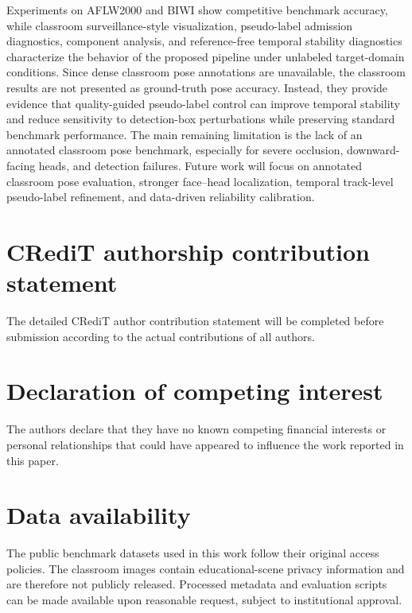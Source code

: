 \documentclass[preprint,12pt]{elsarticle}
\begin{document}
Experiments on AFLW2000 and BIWI show competitive benchmark accuracy, while classroom surveillance-style visualization, pseudo-label admission diagnostics, component analysis, and reference-free temporal stability diagnostics characterize the behavior of the proposed pipeline under unlabeled target-domain conditions. Since dense classroom pose annotations are unavailable, the classroom results are not presented as ground-truth pose accuracy. Instead, they provide evidence that quality-guided pseudo-label control can improve temporal stability and reduce sensitivity to detection-box perturbations while preserving standard benchmark performance. The main remaining limitation is the lack of an annotated classroom pose benchmark, especially for severe occlusion, downward-facing heads, and detection failures. Future work will focus on annotated classroom pose evaluation, stronger face--head localization, temporal track-level pseudo-label refinement, and data-driven reliability calibration.

\section*{CRediT authorship contribution statement}
The detailed CRediT author contribution statement will be completed before submission according to the actual contributions of all authors.

\section*{Declaration of competing interest}
The authors declare that they have no known competing financial interests or personal relationships that could have appeared to influence the work reported in this paper.

\section*{Data availability}
The public benchmark datasets used in this work follow their original access policies. The classroom images contain educational-scene privacy information and are therefore not publicly released. Processed metadata and evaluation scripts can be made available upon reasonable request, subject to institutional approval.



\end{document}
